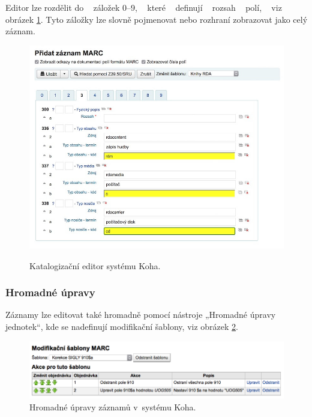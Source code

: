 \documentclass[
	11pt, oneside, printed, final, palatino
	microtype,
	table,   %
	lof,     %
	lot     %
]{fithesis3}
\begin{document}
{Editor lze rozdělit do ~ záložek 0–9, ~ které ~ definují ~ rozsah ~ polí, ~ viz ~ obrázek \ref{fig:editor}. Tyto záložky lze slovně pojmenovat nebo rozhraní zobrazovat jako celý záznam.

\begin{figure}
    \centering
    \includegraphics[width=1.0\textwidth]{resources/katalogizacni_editor}
    \caption{ }{Katalogizační editor systému Koha\protect\footnotemark .}
    \label{fig:editor}
\end{figure}

\subsubsection{{\large Hromadné úpravy}}
Záznamy lze editovat také hromadně pomocí nástroje „Hromadné úpravy jednotek“, kde se nadefinují modifikační šablony, viz obrázek \ref{fig:hromadne_upravy}.

\begin{figure}
    \centering
    \includegraphics[width=1.0\textwidth]{resources/hromadne_upravy}
    \caption{Hromadné úpravy záznamů v~systému Koha.}
    \label{fig:hromadne_upravy}
\end{figure}

}
\end{document}
